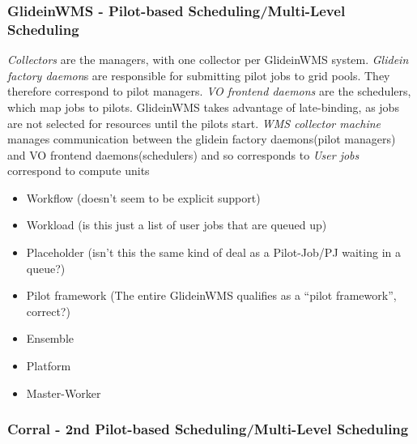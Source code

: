 \documentclass{sig-alternate}
\begin{document}
\subsubsection{GlideinWMS - Pilot-based Scheduling/Multi-Level Scheduling}
\textit{Collectors} are the managers, with one collector per
GlideinWMS system.
\textit{Glidein factory daemon}s are responsible for
submitting pilot jobs to grid pools.
They therefore correspond to pilot managers.
\textit{VO frontend daemons} are the schedulers, which map jobs
to pilots.  GlideinWMS takes advantage of late-binding, as
jobs are not selected for resources until the pilots start.
\textit{WMS collector machine} manages communication between the glidein
factory daemons(pilot managers) and VO frontend daemons(schedulers)
and so corresponds to 
\textit{User jobs} correspond to compute units 

\begin{itemize}
\item Workflow (doesn't seem to be explicit support)
\item Workload (is this just a list of user jobs that are queued up)
\item Placeholder (isn't this the same kind of deal as a Pilot-Job/PJ
waiting in a queue?)
\item Pilot framework (The entire GlideinWMS qualifies as a ``pilot
framework'', correct?)
\item Ensemble 
\item Platform 
\item Master-Worker 
\end{itemize}

\subsubsection{Corral - 2nd Pilot-based Scheduling/Multi-Level Scheduling}
\end{document}
